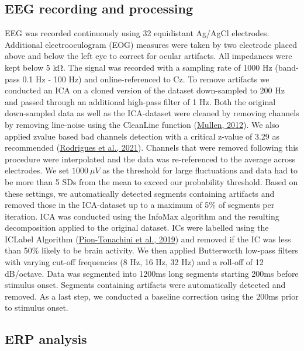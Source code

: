 \documentclass[
  man]{apa7}
\begin{document}
\hypertarget{eeg-recording-and-processing}{%
\subsection{EEG recording and processing}\label{eeg-recording-and-processing}}

EEG was recorded continuously using 32 equidistant Ag/AgCl electrodes. Additional electrooculogram (EOG) measures were taken by two electrode placed above and below the left eye to correct for ocular artifacts. All impedances were kept below 5 kΩ. The signal was recorded with a sampling rate of 1000 Hz (band-pass 0.1 Hz - 100 Hz) and online-referenced to Cz. To remove artifacts we conducted an ICA on a cloned version of the dataset down-sampled to 200 Hz and passed through an additional high-pass filter of 1 Hz. Both the original down-sampled data as well as the ICA-dataset were cleaned by removing channels by removing line-noise using the CleanLine function (\protect\hyperlink{ref-mullen2012cleanline}{Mullen, 2012}). We also applied zvalue based bad channels detection with a critical z-value of 3.29 as recommended (\protect\hyperlink{ref-rodrigues2021epos}{Rodrigues et al., 2021}). Channels that were removed following this procedure were interpolated and the data was re-referenced to the average across electrodes. We set \(1000 \ \mu V\) as the threshold for large fluctuations and data had to be more than 5 SDs from the mean to exceed our probability threshold. Based on these settings, we automatically detected segments containing artifacts and removed those in the ICA-dataset up to a maximum of 5\% of segments per iteration. ICA was conducted using the InfoMax algorithm and the resulting decomposition applied to the original dataset. ICs were labelled using the ICLabel Algorithm (\protect\hyperlink{ref-pion2019iclabel}{Pion-Tonachini et al., 2019}) and removed if the IC was less than 50\% likely to be brain activity. We then applied Butterworth low-pass filters with varying cut-off frequencies (8 Hz, 16 Hz, 32 Hz) and a roll-off of 12 dB/octave. Data was segmented into 1200ms long segments starting 200ms before stimulus onset. Segments containing artifacts were automatically detected and removed. As a last step, we conducted a baseline correction using the 200ms prior to stimulus onset.

\hypertarget{erp-analysis}{%
\subsection{ERP analysis}\label{erp-analysis}}
\end{document}
